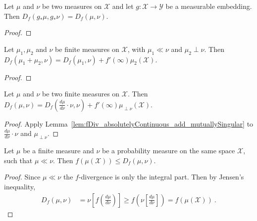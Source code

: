 \begin{lemma}
  \label{lem:fDiv_map_measurableEmbedding}
  \leanok
  Let $\mu$ and $\nu$ be two measures on $\mathcal X$ and let $g : \mathcal X \to \mathcal Y$ be a measurable embedding. Then $D_f(g_* \mu, g_* \nu) = D_f(\mu, \nu)$.
\end{lemma}

\begin{proof}\leanok
\end{proof}

\begin{lemma}
  \label{lem:fDiv_absolutelyContinuous_add_mutuallySingular}
  \leanok
  Let $\mu_1, \mu_2$ and $\nu$ be finite measures on $\mathcal X$, with $\mu_1 \ll \nu$ and $\mu_2 \perp \nu$.
  Then $D_f(\mu_1 + \mu_2, \nu) = D_f(\mu_1, \nu) + f'(\infty) \mu_2(\mathcal X)$.
\end{lemma}

\begin{proof}\leanok
\end{proof}

\begin{lemma}
  \label{lem:fDiv_eq_add_withDensity_derivAtTop}
  \leanok
  Let $\mu$ and $\nu$ be two finite measures on $\mathcal X$.
  Then $D_f(\mu, \nu) = D_f(\frac{d\mu}{d\nu}\cdot \nu, \nu) + f'(\infty) \mu_{\perp \nu}(\mathcal X)$.
\end{lemma}

\begin{proof}\leanok
{}
Apply Lemma~\ref{lem:fDiv_absolutelyContinuous_add_mutuallySingular} to $\frac{d\mu}{d\nu}\cdot \nu$ and $\mu_{\perp \nu}$.
\end{proof}

\begin{lemma}
  \label{lem:le_fDiv_of_ac}
  \leanok
  Let $\mu$ be a finite measure and $\nu$ be a probability measure on the same space $\mathcal X$, such that $\mu \ll \nu$. Then $f(\mu(\mathcal X)) \le D_f(\mu, \nu)$.
\end{lemma}

\begin{proof}\leanok
Since $\mu \ll \nu$ the $f$-divergence is only the integral part. Then by Jensen's inequality,
\begin{align*}
D_f(\mu, \nu)
&= \nu\left[ f\left( \frac{d\mu}{d\nu} \right) \right]
\ge f\left( \nu\left[\frac{d\mu}{d\nu} \right] \right)
= f(\mu(\mathcal X))
\: .
\end{align*}

\end{proof}

